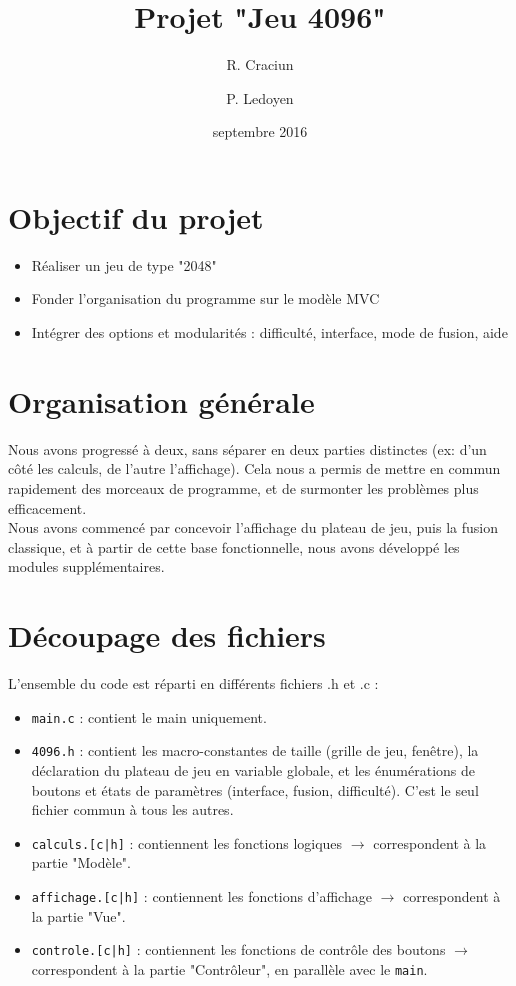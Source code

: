 \documentclass[12pt,a4paper]{article}
\author{R. Craciun \and P. Ledoyen}
\title{Projet "Jeu 4096"}
\date{septembre 2016}
\begin{document}
\maketitle

\section{Objectif du projet}
\begin{itemize}
\item Réaliser un jeu de type "2048"
\item Fonder l'organisation du programme sur le modèle MVC
\item Intégrer des options et modularités : difficulté, interface, mode de fusion, aide
\end{itemize}

\section{Organisation générale}
Nous avons progressé à deux, sans séparer en deux parties distinctes (ex: d'un côté les calculs, de l'autre l'affichage). Cela nous a permis de mettre en commun rapidement des morceaux de programme,
et de surmonter les problèmes plus efficacement.\\

Nous avons commencé par concevoir l'affichage du plateau de jeu, puis la fusion classique, et à partir de cette base fonctionnelle, nous avons développé les modules supplémentaires.

\section{Découpage des fichiers}
L'ensemble du code est réparti en différents fichiers .h et .c :
\begin{itemize}
\item \texttt{main.c} : contient le main uniquement.
\item \texttt{4096.h} : contient les macro-constantes de taille (grille de jeu, fenêtre), la déclaration du plateau de jeu en variable globale, et les énumérations de boutons et états de paramètres (interface, fusion, difficulté). C'est le seul fichier commun à tous les autres.
\item \texttt{calculs.[c|h]} : contiennent les fonctions logiques $\rightarrow$ correspondent à la partie "Modèle".
\item \texttt{affichage.[c|h]} : contiennent les fonctions d'affichage $\rightarrow$ correspondent à la partie "Vue".
\item \texttt{controle.[c|h]} : contiennent les fonctions de contrôle des boutons $\rightarrow$ correspondent à la partie "Contrôleur", en parallèle avec le \texttt{main}.
\end{itemize}
\end{document}
